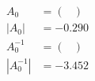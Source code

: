 
\begin{align}
A_0 & = 
\begin{pmatrix}

\end{pmatrix} \\
|A_0| & = -0.290 \\
A_0^{-1} & = 
\begin{pmatrix}

\end{pmatrix} \\
|A_0^{-1}| & = -3.452
\end{align}

